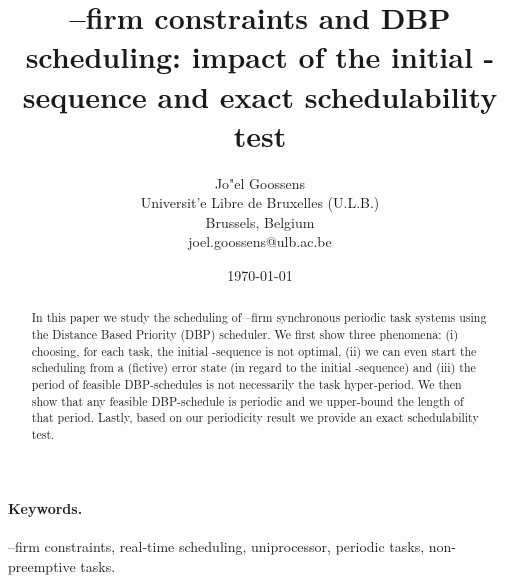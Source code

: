 \documentclass{article}
\newcommand{\mkf}{--firm}
\begin{document}
\title{\mkf{} constraints and DBP scheduling: impact of the initial -sequence and exact schedulability test}

\date{\today}

\author{
Jo\a"el Goossens\\Universit\a'e Libre de Bruxelles (U.L.B.)\\Brussels, Belgium\\joel.goossens@ulb.ac.be
}

\maketitle
\thispagestyle{empty}



\begin{abstract}
In this paper we study the scheduling of --firm synchronous periodic task systems using the Distance Based Priority (DBP) scheduler. We first show three phenomena: (i) choosing, for each task, the initial -sequence  is not optimal, (ii) we can even start the scheduling from a (fictive) error state (in regard to the initial -sequence) and (iii) the period of feasible DBP-schedules is not necessarily the task hyper-period. We then show that any feasible DBP-schedule is periodic and we upper-bound the length of that period. Lastly, based on our periodicity result we provide an exact schedulability test.
\end{abstract}

\paragraph{Keywords.} --firm constraints, real-time scheduling, uniprocessor, periodic tasks, non-preemptive tasks.
\end{document}
